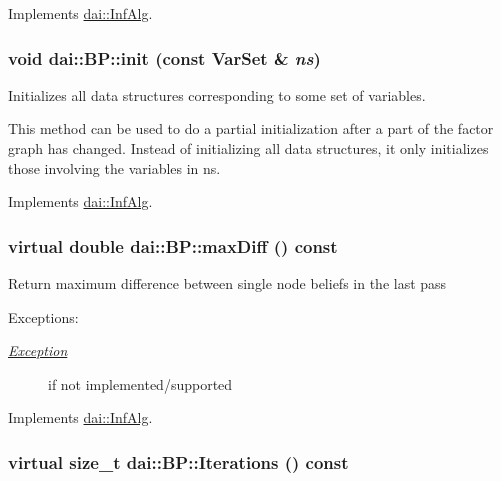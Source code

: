 Implements \hyperlink{classdai_1_1InfAlg_99dd53d1aaccf09a4b977a49a983cc85}{dai::InfAlg}.\hypertarget{classdai_1_1BP_b711dcd5db848b6d993fac482b64ee20}{
\subsubsection[init]{\setlength{\rightskip}{0pt plus 5cm}void dai::BP::init (const {\bf VarSet} \& {\em ns})}}
\label{classdai_1_1BP_b711dcd5db848b6d993fac482b64ee20}


Initializes all data structures corresponding to some set of variables. 

This method can be used to do a partial initialization after a part of the factor graph has changed. Instead of initializing all data structures, it only initializes those involving the variables in ns. 

Implements \hyperlink{classdai_1_1InfAlg_7d006e89e01a2f3e2a40b0f7f6e37ae5}{dai::InfAlg}.\hypertarget{classdai_1_1BP_9954b795f95ae1730d4e09a06afd8ee4}{
\subsubsection[maxDiff]{\setlength{\rightskip}{0pt plus 5cm}virtual double dai::BP::maxDiff () const}}
\label{classdai_1_1BP_9954b795f95ae1730d4e09a06afd8ee4}


Return maximum difference between single node beliefs in the last pass \begin{Desc}
\item[Exceptions:]
\begin{description}
\item[{\em \hyperlink{classdai_1_1Exception}{Exception}}]if not implemented/supported \end{description}
\end{Desc}


Implements \hyperlink{classdai_1_1InfAlg_7e1ca7da15403d5d2af4a855186c0b46}{dai::InfAlg}.\hypertarget{classdai_1_1BP_be6cbc2992d38144198c8f4ea731a26e}{
\subsubsection[Iterations]{\setlength{\rightskip}{0pt plus 5cm}virtual size\_\-t dai::BP::Iterations () const}}
\label{classdai_1_1BP_be6cbc2992d38144198c8f4ea731a26e}


